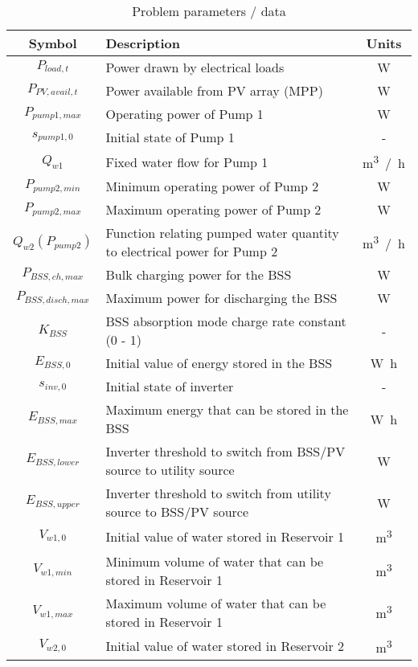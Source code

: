 \begin{table}[htb]
	\begin{threeparttable}[b]
		\caption{Problem parameters / data}
		\label{table:parameters}
		\begin{tabular}{cp{}c}
			\toprule 
			Symbol & Description & Units \\
			\midrule
			$P_{load,t}$ & Power drawn by electrical loads & \si{W} \\
			$P_{PV,avail,t}$ & Power available from PV array (MPP) & \si{W} \\
			$P_{pump1,max}$ & Operating power of Pump 1 & \si{W} \\
			$s_{pump1,0}$ & Initial state of Pump 1 & - \\
			$Q_{w1}$ & Fixed water flow for Pump 1 & \si{m^3 / h} \\
			$P_{pump2,min}$ & Minimum operating power of Pump 2 & \si{W} \\
			$P_{pump2,max}$ & Maximum operating power of Pump 2 & \si{W} \\
			$Q_{w2}\left(P_{pump2}\right)$ & Function relating pumped water quantity to electrical power for Pump 2 & \si{m^3 / h} \\
			$P_{BSS,ch,max}$ & Bulk charging power for the BSS & \si{W} \\
			$P_{BSS,disch,max}$ & Maximum power for discharging the BSS & \si{W} \\
			$K_{BSS}$ & BSS absorption mode charge rate constant (0 - 1) & - \\
			$E_{BSS,0}$ & Initial value of energy stored in the BSS & \si{W h} \\
			$s_{inv,0}$ & Initial state of inverter & - \\
			$E_{BSS,max}$ & Maximum energy that can be stored in the BSS & \si{W h} \\
			$E_{BSS,lower}$ & Inverter threshold to switch from BSS/PV source to utility source & \si{W} \\
			$E_{BSS,upper}$ & Inverter threshold to switch from utility source to BSS/PV source & \si{W} \\
			$V_{w1,0}$ & Initial value of water stored in Reservoir 1 & \si{m^3} \\
			$V_{w1,min}$ & Minimum volume of water that can be stored in Reservoir 1 & \si{m^3} \\
			$V_{w1,max}$ & Maximum volume of water that can be stored in Reservoir 1 & \si{m^3} \\
			$V_{w2,0}$ & Initial value of water stored in Reservoir 2 & \si{m^3} \\

\end{tabular}
\end{threeparttable}
\end{table}
